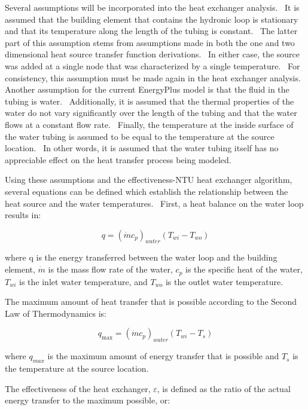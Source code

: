 Several assumptions will be incorporated into the heat exchanger analysis.~ It is assumed that the building element that contains the hydronic loop is stationary and that its temperature along the length of the tubing is constant.~ The latter part of this assumption stems from assumptions made in both the one and two dimensional heat source transfer function derivations.~ In either case, the source was added at a single node that was characterized by a single temperature.~ For consistency, this assumption must be made again in the heat exchanger analysis.~ Another assumption for the current EnergyPlus model is that the fluid in the tubing is water.~ Additionally, it is assumed that the thermal properties of the water do not vary significantly over the length of the tubing and that the water flows at a constant flow rate.~ Finally, the temperature at the inside surface of the water tubing is assumed to be equal to the temperature at the source location.~ In other words, it is assumed that the water tubing itself has no appreciable effect on the heat transfer process being modeled.

Using these assumptions and the effectiveness-NTU heat exchanger algorithm, several equations can be defined which establish the relationship between the heat source and the water temperatures.~ First, a heat balance on the water loop results in:

\begin{equation}
q = {\left( {\dot m{c_p}} \right)_{water}}\left( {{T_{wi}} - {T_{wo}}} \right)
\label{eq:RadSysHX673}
\end{equation}

where q is the energy transferred between the water loop and the building element, \(\dot m\) is the mass flow rate of the water, \(c_p\) is the specific heat of the water, \(T_{wi}\) is the inlet water temperature, and \(T_{wo}\) is the outlet water temperature.

The maximum amount of heat transfer that is possible according to the Second Law of Thermodynamics is:

\begin{equation}
{q_{\max }} = {\left( {\dot m{c_p}} \right)_{water}}\left( {{T_{wi}} - {T_s}} \right)
\label{eq:RadSysHX674}
\end{equation}

where \(q_{max}\) is the maximum amount of energy transfer that is possible and \(T_s\) is the temperature at the source location.

The effectiveness of the heat exchanger, \(\varepsilon\), is defined as the ratio of the actual energy transfer to the maximum possible, or:

